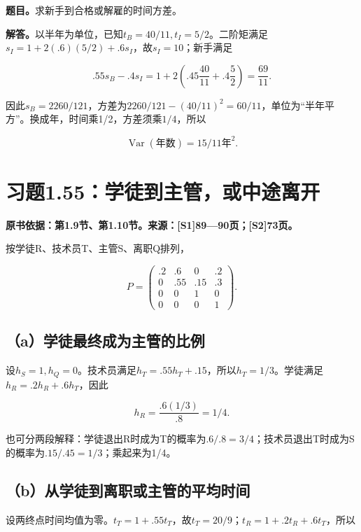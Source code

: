 \documentclass[
  11pt,
  a4paper,
  UTF8,
  fontset=fandol]{ctexart}
\begin{document}
\textbf{题目。}求新手到合格或解雇的时间方差。

\textbf{解答。}以半年为单位，已知\(t_B=40/11,t_I=5/2\)。二阶矩满足\(s_I=1+2(.6)(5/2)+.6s_I\)，故\(s_I=10\)；新手满足

\[
.55s_B-.4s_I=1+2\left(.45\frac{40}{11}+.4\frac52\right)=\frac{69}{11}.
\]

因此\(s_B=2260/121\)，方差为\(2260/121-(40/11)^2=60/11\)，单位为``半年平方''。换成年，时间乘1/2，方差须乘\(1/4\)，所以

\[
\boxed{\operatorname{Var}(\text{年数})=15/11\text{年}^2.}
\]

\section{习题1.55：学徒到主管，或中途离开}\label{ux4e60ux98981.55ux5b66ux5f92ux5230ux4e3bux7ba1ux6216ux4e2dux9014ux79bbux5f00}

\textbf{原书依据：第1.9节、第1.10节。来源：{[}S1{]}89---90页；{[}S2{]}73页。}

按学徒R、技术员T、主管S、离职Q排列，

\[
P=\begin{pmatrix}
.2&.6&0&.2\\0&.55&.15&.3\\0&0&1&0\\0&0&0&1
\end{pmatrix}.
\]

\subsection{（a）学徒最终成为主管的比例}\label{aux5b66ux5f92ux6700ux7ec8ux6210ux4e3aux4e3bux7ba1ux7684ux6bd4ux4f8b}

设\(h_S=1,h_Q=0\)。技术员满足\(h_T=.55h_T+.15\)，所以\(h_T=1/3\)。学徒满足\(h_R=.2h_R+.6h_T\)，因此

\[
\boxed{h_R=\frac{.6(1/3)}{.8}=1/4.}
\]

也可分两段解释：学徒退出R时成为T的概率为\(.6/.8=3/4\)；技术员退出T时成为S的概率为\(.15/.45=1/3\)；乘起来为1/4。

\subsection{（b）从学徒到离职或主管的平均时间}\label{bux4eceux5b66ux5f92ux5230ux79bbux804cux6216ux4e3bux7ba1ux7684ux5e73ux5747ux65f6ux95f4}

设两终点时间均值为零。\(t_T=1+.55t_T\)，故\(t_T=20/9\)；\(t_R=1+.2t_R+.6t_T\)，所以
\end{document}
